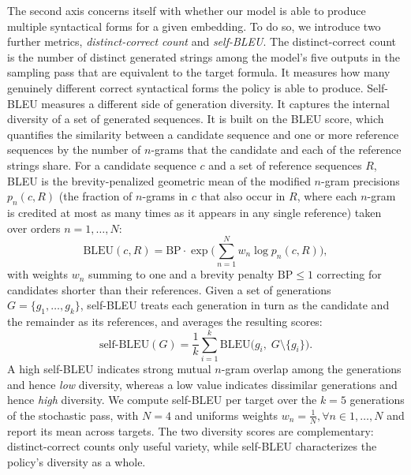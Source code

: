 \documentclass[titlepage,a4paper,11pt]{report}
\begin{document}
    The second axis concerns itself with whether our model is able to produce multiple syntactical forms for a given embedding. To do so, we introduce two further metrics, \textit{distinct-correct count} and \textit{self-BLEU}. The distinct-correct count is the number of distinct generated strings among the model's five outputs in the sampling pass that are equivalent to the target formula. It measures how many genuinely different correct syntactical forms the policy is able to produce. Self-BLEU \citep{zhu_texygen_2018} measures a different side of generation diversity. It captures the internal diversity of a set of generated sequences. It is built on the BLEU score, which quantifies the similarity between a candidate sequence and one or more reference sequences by the number of $n$-grams that the candidate and each of the reference strings share. For a candidate sequence $c$ and a set of reference sequences $R$, BLEU is the brevity-penalized geometric mean of the modified $n$-gram precisions $p_n(c, R)$ (the fraction of $n$-grams in $c$ that also occur in $R$, where each $n$-gram is credited at most as many times as it appears in any single reference) taken over orders $n = 1, \dots, N$:
    \begin{equation}
        \text{BLEU}(c, R) = \mathrm{BP}\cdot\exp\!\Big(\textstyle\sum_{n=1}^{N} w_n \log p_n(c, R)\Big),
    \end{equation}
    with weights $w_n$ summing to one and a brevity penalty $\mathrm{BP} \le 1$ correcting for candidates shorter than their references. Given a set of generations $G = \{g_1, \dots, g_k\}$, self-BLEU treats each generation in turn as the candidate and the remainder as its references, and averages the resulting scores:
    \begin{equation}
        \text{self-BLEU}(G) = \frac{1}{k}\sum_{i=1}^{k} \text{BLEU}\big(g_i,\; G \setminus \{g_i\}\big).
    \end{equation}
    A high self-BLEU indicates strong mutual $n$-gram overlap among the generations and hence \emph{low} diversity, whereas a low value indicates dissimilar generations and hence \emph{high} diversity. We compute self-BLEU per target over the $k = 5$ generations of the stochastic pass, with $N=4$ and uniforms weights $w_n = \frac{1}{N}, \forall n \in 1,\dots,N$ and report its mean across targets. The two diversity scores are complementary: distinct-correct counts only useful variety, while self-BLEU characterizes the policy's diversity as a whole.
\end{document}
